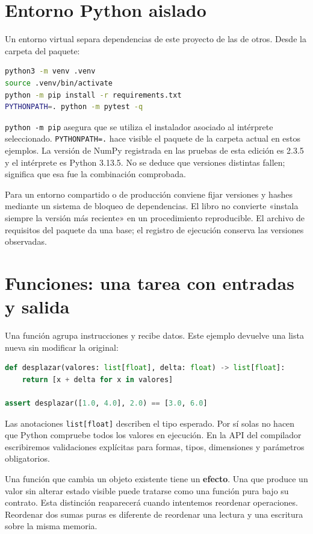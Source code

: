 \documentclass[12pt,a4paper,oneside]{report}
\begin{document}
\section{Entorno Python aislado}
Un entorno virtual separa dependencias de este proyecto de las de otros. Desde la carpeta del paquete:

\begin{lstlisting}[language=bash]
python3 -m venv .venv
source .venv/bin/activate
python -m pip install -r requirements.txt
PYTHONPATH=. python -m pytest -q
\end{lstlisting}
\texttt{python -m pip} asegura que se utiliza el instalador asociado al intérprete seleccionado. \texttt{PYTHONPATH=.} hace visible el paquete de la carpeta actual en estos ejemplos. La versión de NumPy registrada en las pruebas de esta edición es 2.3.5 y el intérprete es Python 3.13.5. No se deduce que versiones distintas fallen; significa que esa fue la combinación comprobada.

Para un entorno compartido o de producción conviene fijar versiones y hashes mediante un sistema de bloqueo de dependencias. El libro no convierte «instala siempre la versión más reciente» en un procedimiento reproducible. El archivo de requisitos del paquete da una base; el registro de ejecución conserva las versiones observadas.

\section{Funciones: una tarea con entradas y salida}
Una función agrupa instrucciones y recibe datos. Este ejemplo devuelve una lista nueva sin modificar la original:

\begin{lstlisting}[language=Python]
def desplazar(valores: list[float], delta: float) -> list[float]:
    return [x + delta for x in valores]

assert desplazar([1.0, 4.0], 2.0) == [3.0, 6.0]
\end{lstlisting}
Las anotaciones \texttt{list[float]} describen el tipo esperado. Por sí solas no hacen que Python compruebe todos los valores en ejecución. En la API del compilador escribiremos validaciones explícitas para formas, tipos, dimensiones y parámetros obligatorios.

Una función que cambia un objeto existente tiene un \textbf{efecto}. Una que produce un valor sin alterar estado visible puede tratarse como una función pura bajo su contrato. Esta distinción reaparecerá cuando intentemos reordenar operaciones. Reordenar dos sumas puras es diferente de reordenar una lectura y una escritura sobre la misma memoria.
\end{document}
